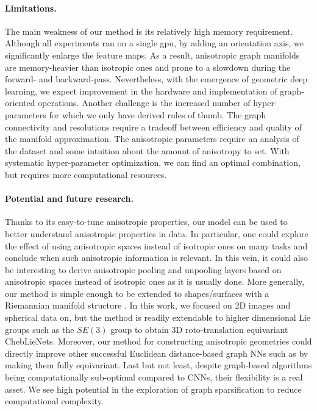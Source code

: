 \documentclass{article}
\begin{document}
\paragraph{Limitations.} The main weakness of our method is its relatively high memory requirement. Although all experiments ran on a single gpu, by adding an orientation axis, we significantly enlarge the feature maps. As a result, anisotropic graph manifolds are memory-heavier than isotropic ones and prone to a slowdown during the forward- and backward-pass. Nevertheless, with the emergence of geometric deep learning, we expect improvement in the hardware and implementation of graph-oriented operations. %
Another challenge is the increased number of hyper-parameters for which we only have derived rules of thumb. The graph connectivity and resolutions require a tradeoff between efficiency and quality of the manifold approximation. The anisotropic parameters require an analysis of the dataset and some intuition about the amount of anisotropy to set. With systematic hyper-parameter optimization, we can find an optimal combination, but requires more computational resources.

\paragraph{Potential and future research.} Thanks to its easy-to-tune anisotropic properties, our model can be used to better understand anisotropic properties in data. In particular, one could explore the effect of using anisotropic spaces instead of isotropic ones on many tasks and conclude when such anisotropic information is relevant. In this vein, it could also be interesting to derive anisotropic pooling and unpooling layers based on anisotropic spaces instead of isotropic ones as it is usually done. More generally, our method is simple enough to be extended to shapes/surfaces with a Riemannian manifold structure \citep{cohen2019gauge}. In this work, we focused on 2D images and spherical data on, but the method is readily extendable to higher dimensional Lie groups such as the $SE(3)$ group to obtain 3D roto-translation equivariant ChebLieNets. Moreover, our method for constructing anisotropic geometries could directly improve other successful Euclidean distance-based graph NNs such as \citep{satorras2021n} by making them fully equivariant. Last but not least, despite graph-based algorithms being computationally sub-optimal compared to CNNs, their flexibility is a real asset. We see high potential in the exploration of graph sparsification to reduce computational complexity. %
\end{document}
